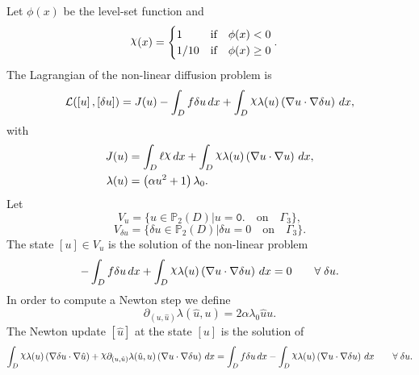 \documentclass[preview]{standalone}
\let\oldcdot\cdot
\let\cdot\oldcdot
\begin{document}
Let $\phi(x)$ be the level-set function and
 \begin{align*}\raisebox{\depth}{$\chi$}(x) &= \begin{cases} 1 & \mbox{if}\quad \phi(x) < 0 \\ 1/10 & \mbox{if}\quad \phi(x)  \ge 0 \end{cases}.\end{align*}
The Lagrangian of the non-linear diffusion problem is
\begin{dmath*}
\mathcal L(\left[ u\right],\left[ \delta u\right]) = J(u) -  \int_{D} f \delta u \,dx +  \int_{D} \raisebox{\depth}{$\chi$} \lambda(u) \left(  \nabla u  \cdot  \nabla \delta u  \right) \,dx , 
\end{dmath*}
with 
\begin{align*}
J(u) &=  \int_{D} \ell \raisebox{\depth}{$\chi$} \,dx +  \int_{D} \raisebox{\depth}{$\chi$} \lambda(u) \left(  \nabla u  \cdot  \nabla u  \right) \,dx,\\
\lambda(u) &= \left(\alpha u^{2} + 1\right) \lambda_{0}.
 \end{align*}
Let
\begin{equation*}
V_{u} = \{ u \in \mathbb P_{2}(D)| u = \mathtt{\text{0.}}  \quad \text{{on}} \quad\Gamma_{3} \},\end{equation*}
\begin{equation*}
V_{\delta u} = \{ \delta u \in \mathbb P_{2}(D)| \delta u = 0  \quad \text{{on}} \quad\Gamma_{3} \}.\end{equation*}
The state $\left[ u\right] \in  V_{u}$ is the solution of the non-linear problem
\begin{dmath*}
-  \int_{D} f \delta u \,dx +  \int_{D} \raisebox{\depth}{$\chi$} \lambda(u) \left(  \nabla u  \cdot  \nabla \delta u  \right) \,dx = 0\qquad \forall\; \delta u . 
\end{dmath*}
In order to compute a Newton step we define
\begin{dmath*}
\partial_{(u,\hat u)} \lambda(\hat u,u) = 2 \alpha \lambda_{0} \hat u u.
 \end{dmath*}
The Newton update $\left[ \hat u\right]$ at the state $\left[ u\right]$ is the solution of
\begin{dmath*}
 \int_{D} \raisebox{\depth}{$\chi$} \lambda(u) \left(  \nabla \delta u  \cdot  \nabla \hat u  \right) + \raisebox{\depth}{$\chi$} \partial_{(u,\hat u)} \lambda(\hat u,u) \left(  \nabla u  \cdot  \nabla \delta u  \right) \,dx =  \int_{D} f \delta u \,dx -  \int_{D} \raisebox{\depth}{$\chi$} \lambda(u) \left(  \nabla u  \cdot  \nabla \delta u  \right) \,dx\qquad \forall\; \delta u . 
\end{dmath*}
\end{document}
